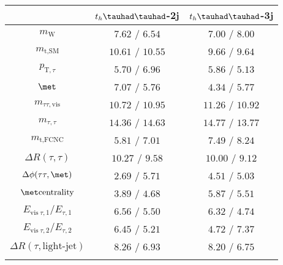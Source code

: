 \centering
\begin{tabular}{ccc} \toprule\toprule
  & $t_h\thadhad$-2j & $t_h\thadhad$-3j\\\midrule
$m_{\text{W}}$                               & $7.62$ / $6.54$ & $7.00$ / $8.00$\\
$m_{\text{t},\text{SM}}$                            & $10.61$ / $10.55$ & $9.66$ / $9.64$\\
$p_{\text{T},\tau }$                         & $5.70$ / $6.96$ & $5.86$ / $5.13$\\
$\met$                        & $7.07$ / $5.76$ & $4.34$ / $5.77$\\
$m_{\tau\tau,\text{vis}}$                  & $10.72$ / $10.95$ & $11.26$ / $10.92$\\
$m_{\tau ,\tau }$                     & $14.36$ / $14.63$ & $14.77$ / $13.77$\\
$m_{\text{t},\text{FCNC}}$                          & $5.81$ / $7.01$ & $7.49$ / $8.24$\\
$\Delta R(\tau,\tau)$               & $10.27$ / $9.58$ & $10.00$ / $9.12$\\
$\Delta\phi(\tau\tau,\met)$ & $2.69$ / $5.71$ & $4.51$ / $5.03$\\
$\met \text{centrality}$             & $3.89$ / $4.68$ & $5.87$ / $5.51$\\
$E_{\text{vis}~\tau ,1}/E_{\tau ,1}$         & $6.56$ / $5.50$ & $6.32$ / $4.74$\\
$E_{\text{vis}~\tau ,2}/E_{\tau ,2}$         & $6.45$ / $5.21$ & $4.72$ / $7.37$\\
$\Delta R(\tau,\text{light-jet})$       & $8.26$ / $6.93$ & $8.20$ / $6.75$\\
\bottomrule\bottomrule\\
\end{tabular}
